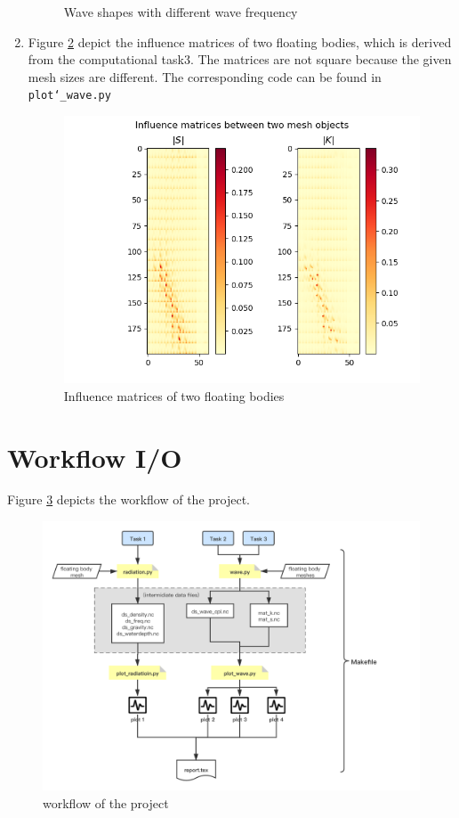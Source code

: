 \documentclass{article}
\begin{document}
\begin{enumerate}
\begin{figure}[!htb]
        \caption{Wave shapes with different wave frequency}
        \label{fig:plt3}
    \end{figure}
    \item Figure \ref{fig:plt4} depict the influence matrices of two floating bodies, which is derived from the computational task3. The matrices are not square because the given mesh sizes are different. The corresponding code can be found in \texttt{plot\char`_wave.py}
    \begin{figure}[!htb]
        \centering
        \includegraphics[width=1\textwidth]{img/2_3_infmatrix.png}
        \caption{Influence matrices of two floating bodies}
        \label{fig:plt4}
    \end{figure}

\end{enumerate}

\section{Workflow I/O}
Figure \ref{fig:plt5} depicts the workflow of the project.
\begin{figure}[!htb]
    \centering
    \includegraphics[width=1\textwidth]{workflow.png}
    \caption{workflow of the project}
    \label{fig:plt5}
\end{figure}

\clearpage


\end{document}
